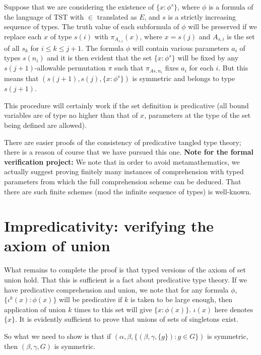 Suppose that we are considering the existence of $\{x : \phi^s\}$, where $\phi$ is a formula of the language of TST with $\in$ translated as $E$, and $s$ is a strictly increasing sequence of types.  The truth value of each subformula of $\phi$ will be preserved if we replace each $x$ of type $s(i)$ with $\pi_{A_{s,i}}(x)$, where
$x=s(j)$ and $A_{s,i}$ is the set of all $s_k$ for $i \leq k \leq j+1$.  The formula $\phi$ will contain various parameters $a_i$ of types $s(n_i)$ and it is then evident that the set $\{x : \phi^s\}$ will be fixed by any $s(j+1)$-allowable permutation $\pi$ such that $\pi_{A{s,n_i}}$ fixes $a_i$ for each $i$.  But this means that
$(s(j+1),s(j),\{x : \phi^s\})$ is symmetric and belongs to type $s(j+1)$.

This procedure will certainly work if the set definition is predicative (all bound variables are of type no higher than that of $x$, parameters at the type
of the set being defined are allowed).

There are easier proofs of the consistency of predicative tangled type theory;  there is a reason of course that we have pursued this one.
{\bf Note for the formal verification project:}  We note that in order to avoid metamathematics, we actually suggest proving finitely many instances of comprehension with typed parameters from which the full comprehension scheme can be deduced.  That there are such finite schemes (mod the infinite sequence of types) is well-known.

\newpage
\section{Impredicativity:  verifying the axiom of union}

What remains to complete the proof is that typed versions of the axiom of set union hold.  That this is sufficient is a fact about predicative type theory.
If we have predicative comprehension and union, we note that for any formula $\phi$, $\{\iota^k(x):\phi(x)\}$ will be predicative if $k$ is taken to be large enough, then application of union $k$ times to this set will give $\{x:\phi(x)\}$.  $\iota(x)$ here denotes $\{x\}$.  It is evidently sufficient to prove that unions of sets of singletons exist.

So what we need to show is that if $(\alpha,\beta,\{(\beta,\gamma,\{g\}):g \in G\})$ is symmetric, then $(\beta,\gamma,G)$ is symmetric.

